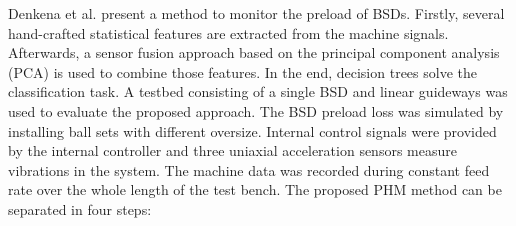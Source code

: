 Denkena et al. \cite{Denkena2021} present a method to monitor the preload of BSDs. Firstly, several hand-crafted statistical features are extracted from the machine signals. Afterwards, a sensor fusion approach based on the principal component analysis (PCA) is used to combine those features. In the end, decision trees solve the classification task. A testbed consisting of a single BSD and linear guideways was used to evaluate the proposed approach. The BSD preload loss was simulated by installing ball sets with different oversize. Internal control signals were provided by the internal controller and three uniaxial acceleration sensors measure vibrations in the system. The machine data was recorded during constant feed rate over the whole length of the test bench. The proposed PHM method can be separated in four steps:

